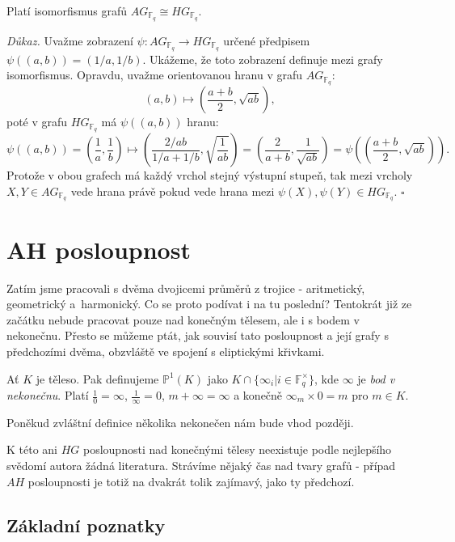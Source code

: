 \documentclass[12pt]{report}
\begin{document}
\begin{veta}
Platí isomorfismus grafů $AG_{\mathbb{F}_q} \cong HG_{\mathbb{F}_q}$.
\end{veta}
\noindent \textit{Důkaz.} Uvažme zobrazení $\psi : AG_{\mathbb{F}_q} \longrightarrow HG_{\mathbb{F}_q}$ určené předpisem $\psi((a,b)) = (1/a,1/b)$. Ukážeme, že toto zobrazení definuje mezi grafy isomorfismus. Opravdu, uvažme orientovanou hranu v grafu $AG_{\mathbb{F}_q}$: 
$$(a,b) \longmapsto \left(\frac{a+b}{2}, \sqrt{ab} \right),$$
poté v grafu $HG_{\mathbb{F}_q}$ má $\psi((a,b))$ hranu:
$$\psi ((a,b)) = \left(\frac{1}{a}, \frac{1}{b} \right) \longmapsto \left(\frac{2/ab}{1/a+1/b}, \sqrt{\frac{1}{ab}} \right) = \left( \frac{2}{a+b}, \frac{1}{\sqrt{ab}} \right) = \psi \left( \left( \frac{a+b}{2}, \sqrt{ab} \right) \right).$$
Protože v obou grafech má každý vrchol stejný výstupní stupeň, tak mezi vrcholy $X,Y \in AG_{\mathbb{F}_q}$ vede hrana právě pokud vede hrana mezi $\psi(X),\psi(Y) \in HG_{\mathbb{F}_q}$.
\hfill $\square$\\


\chapter{AH posloupnost}
Zatím jsme pracovali s dvěma dvojicemi průměrů z trojice - aritmetický, geometrický a~harmonický. Co se proto podívat i na tu poslední? Tentokrát již ze začátku nebude pracovat pouze nad konečným tělesem, ale i s bodem v nekonečnu. Přesto se můžeme ptát, jak souvisí tato posloupnost a její grafy s předchozími dvěma, obzvláště ve spojení s eliptickými křivkami.

\begin{definice}
Ať $K$ je těleso. Pak definujeme $\mathbb{P}^{1} (K)$ jako $K \cap \lbrace \infty_i  \vert i \in \mathbb{F}_q ^{\times} \rbrace$, kde $\infty$ je \textit{bod v nekonečnu}. Platí $\frac{1}{0} = \infty$, $\frac{1}{\infty} = 0$, $m+\infty = \infty$ a konečně $\infty_m \times 0 = m$ pro $m \in K$.
\end{definice}

Poněkud zvláštní definice několika nekonečen nám bude vhod později.

K této ani $HG$ posloupnosti nad konečnými tělesy neexistuje podle nejlepšího svědomí autora žádná literatura. Strávíme nějaký čas nad tvary grafů - případ $AH$ posloupnosti je totiž na dvakrát tolik zajímavý, jako ty předchozí.

\section{Základní poznatky}
\end{document}
